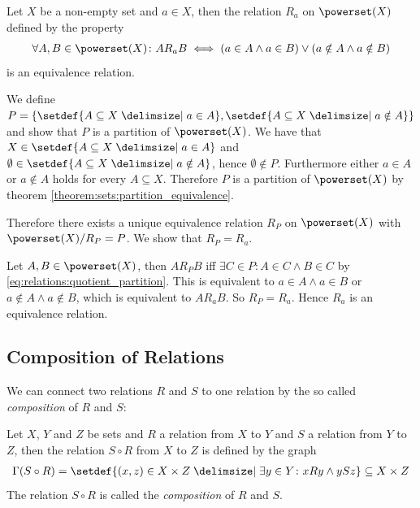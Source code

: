 \begin{examples}
    \begin{exampleenumerate}
        \item Let $X$ be a non-empty set and $a\in X$, then the relation $R_a$ on $\powerset(X)$ defined by the property \begin{align}\forall A,B\in\powerset(X)\colon A R_a B\iff (a\in A\land a\in B)\lor (a\notin A\land a\notin B)\end{align}
        is an equivalence relation.
        \begin{miniproof}
            We define $P=\{\setdef{A\subseteq X\given a\in A},\setdef{A\subseteq X\given a\notin A}\}$ and show that $P$ is a partition of $\powerset(X)$. We have that $X\in\setdef{A\subseteq X\given a\in A}$ and $\emptyset\in\setdef{A\subseteq X\given a\notin A}$, hence $\emptyset\notin P$. Furthermore either $a\in A$ or $a\notin A$ holds for every $A\subseteq X$. Therefore $P$ is a partition of $\powerset(X)$ by theorem \ref{theorem:sets:partition_equivalence}.

            Therefore there exists a unique equivalence relation $R_P$ on $\powerset(X)$ with $\powerset(X)/R_P=P$. We show that $R_P=R_a$.

            Let $A,B\in\powerset(X)$, then $A R_P B$ iff $\exists C\in P\colon A\in C\land B\in C$ by \eqref{eq:relations:quotient_partition}. This is equivalent to $a\in A\land a\in B$ or $a\notin A\land a\notin B$, which is equivalent to $A R_a B$. So $R_P=R_a$. Hence $R_a$ is an equivalence relation.
        \end{miniproof}
    \end{exampleenumerate}
\end{examples}

\subsection{Composition of Relations}

We can connect two relations $R$ and $S$ to one relation by the so called \emph{composition} of $R$ and $S$:

\begin{definition}
    Let $X$, $Y$ and $Z$ be sets and $R$ a relation from $X$ to $Y$ and $S$ a relation from $Y$ to $Z$, then the relation $S\circ R$ from $X$ to $Z$ is defined by the graph \begin{align}\Gamma(S\circ R)=\setdef{(x,z)\in X\times Z\given \exists y\in Y\colon x R y\land y S z}\subseteq X\times Z\end{align}
    The relation $S\circ R$ is called the \emph{composition} of $R$ and $S$.
\end{definition}

